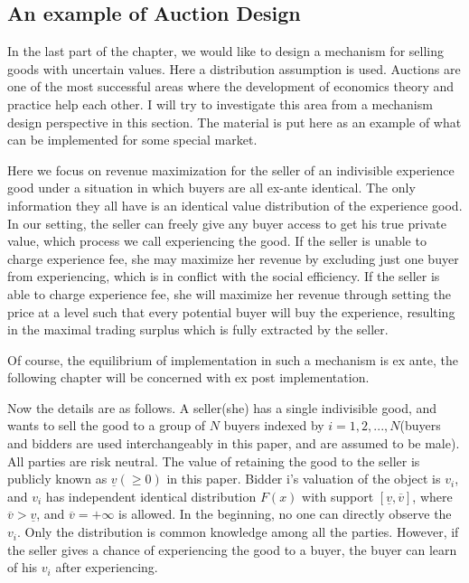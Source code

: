 \subsection{An example of Auction Design}
In the last part of the chapter, we would like to design a mechanism for selling goods with  uncertain values.  Here a distribution assumption is used. Auctions are one of the most successful areas where the development of economics
theory and practice help each other. I will try to investigate this area from
a mechanism design perspective in this section. The material is put here as an example of what can be implemented for some special market. 

Here we focus on revenue maximization for the seller of an indivisible experience
good under a situation in which buyers are all ex-ante identical. The only information they all have is an identical
value distribution of the experience good. In our
setting, the seller can freely give any buyer access to get his true private value, which process we call experiencing the good. If the seller is
unable to charge experience fee, she may maximize her revenue by excluding just one buyer from experiencing, which is in conflict with the social efficiency. If
the seller is able to charge experience fee, she will maximize her revenue through setting
the price at a level such that every potential buyer will buy the experience, 
resulting in the maximal trading surplus which is fully extracted by the seller.

Of course, the equilibrium of implementation in such a mechanism is ex ante,  the following chapter will be concerned with ex post implementation.

Now the details are as follows. A seller(she) has a single indivisible good, and wants to sell the good to a group of $N$ buyers indexed by $i=1, 2, . . . , N$(buyers and
bidders are used interchangeably in this paper, and are assumed to be
male). All parties are risk neutral. 
 The value of retaining the good to the seller
is publicly known as $\underline{v}(\geq 0)$ in this paper. Bidder i's valuation of the object
is $v_{i}$, and $v_{i}$ has independent identical distribution $F(x)$ with support $[\underline{v}, \overline{v}]$, 
where $\overline{v}>\underline{v}$, and $\overline{v}=+\infty$ is allowed. 
In the beginning, no one can directly observe the $v_{i}$. Only the distribution is common knowledge among all the parties. However, if the seller gives a chance of experiencing the good to a buyer, the buyer can learn of his $v_{i}$ after experiencing. 
 


